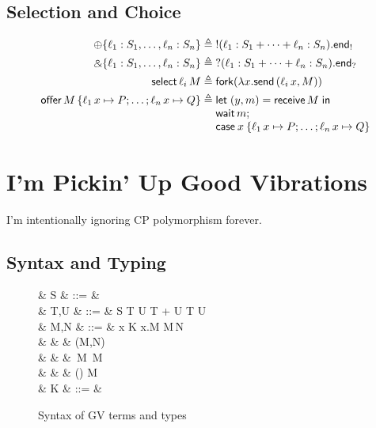 \documentclass[orivec,envcountsame]{llncs}
\begin{document}
\subsection{Selection and Choice}

\small\begin{align*}
  \oplus \{ \ell_1 : S_1,\dots,\ell_n:S_n \} &\defeq \gvout{(\ell_1:S_1 + \cdots + \ell_n:S_n)}{\outterm} \\
  \with \{ \ell_1 : S_1,\dots,\ell_n:S_n \} &\defeq \gvin{(\ell_1:S_1 + \cdots + \ell_n:S_n)}{\interm} \\
  \gvconst{select} \app \ell_i \app M &\defeq \gvconst{fork} (\lambda x. \gvsend(\ell_i \app x, M)) \\
  \gvconst{offer} \app M \,\{ \ell_1 \app x \mapsto P; \dots; \ell_n \app x \mapsto Q \}
    &\defeq \bl \gvlet{(y,m)}{\gvreceive{M}}{\\\gvletunit{\gvconst{wait} \app m}{\\\gvcase{x}{\ell_1 \app x \mapsto P; \dots; \ell_n \app x \mapsto Q}}} \el
\end{align*}\normalsize

\section{I'm Pickin' Up Good Vibrations}\label{sec:gv}

I'm intentionally ignoring CP polymorphism forever.

\subsection{Syntax and Typing}\label{sec:gv-static}

\begin{figure}[t]
\begin{syntax}
   & S & ::= &  \mid {} \mid %
                                   \interm \mid \outterm \mid {} \\
   & T,U & ::= & S \mid T \times U \mid \one \mid T + U \mid \zero \mid T \lto U \\ %
   & M,N & ::= & x \mid K \mid \lambda x.M \mid M\,N \\
  & & \mid & (M,N) \mid {} \\
  & & \mid & \,M \mid {}\,M \mid {} \\
  & & \mid & () \mid {} \mid {} \app M \\
   & K & ::= &  \mid {} \mid {} \mid {} \mid {}\\
\end{syntax}
\caption{Syntax of GV terms and types}\label{fig:gv-syntax}
\end{figure}
\end{document}
